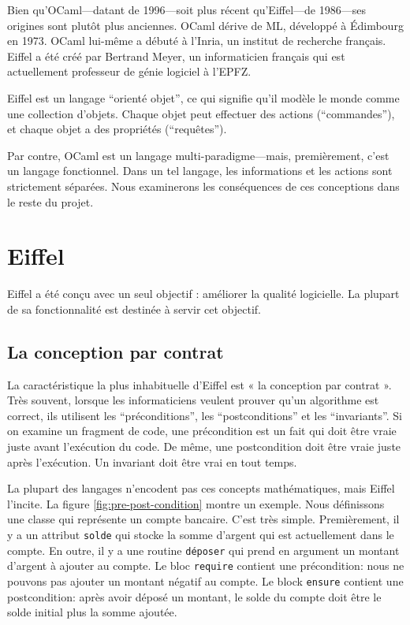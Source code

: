 \documentclass[french]{report}
\begin{document}
Bien qu'OCaml---datant de 1996\cite{ocamldate}---soit plus récent qu'Eiffel---de 1986\cite{eiffeldate}---ses origines sont plutôt plus anciennes.  OCaml dérive de ML, développé à Édimbourg en 1973. OCaml lui-même a débuté à l’\gls{Inria}, un institut de recherche français. Eiffel a été créé par Bertrand Meyer, un informaticien français qui est actuellement professeur de génie logiciel à l’\gls{EPFZ}.

Eiffel est un langage \enquote{orienté objet}, ce qui signifie qu'il modèle le monde comme une collection d’objets. Chaque objet peut effectuer des actions (\enquote{commandes}), et chaque objet a des propriétés (\enquote{requêtes}).

Par contre, OCaml est un langage multi-paradigme---mais, premièrement, c’est un langage fonctionnel. Dans un tel langage, les informations et les actions sont strictement séparées. Nous examinerons les conséquences de ces conceptions dans le reste du projet.

\chapter{Eiffel}

Eiffel a été conçu avec un seul objectif : améliorer la qualité logicielle. La plupart de sa fonctionnalité est destinée à servir cet objectif.
 
\section{La conception par contrat}

La caractéristique la plus inhabituelle d'Eiffel est « la conception par contrat ». Très souvent, lorsque les informaticiens veulent prouver qu’un \gls{algorithme} est correct, ils utilisent les \enquote{préconditions}, les \enquote{postconditions} et les \enquote{invariants}. Si on examine un fragment de code, une précondition est un fait qui doit être vraie juste avant l’exécution du code. De même, une postcondition doit être vraie juste après l’exécution. Un invariant doit être vrai en tout temps.

La plupart des langages n'encodent pas	ces concepts mathématiques, mais Eiffel l'incite. La figure \ref{fig:pre-post-condition} montre un exemple. Nous définissons une classe qui représente un compte bancaire. C'est très simple. Premièrement, il y a un attribut \texttt{solde} qui stocke la somme d'argent qui est actuellement dans le compte. En outre, il y a une routine \texttt{déposer} qui prend en argument un montant d'argent à ajouter au compte. Le bloc \texttt{require} contient une précondition: nous ne pouvons pas ajouter un montant négatif au compte. Le block \texttt{ensure} contient une postcondition: après avoir déposé un montant, le solde du compte doit être le solde initial plus la somme ajoutée.
\end{document}
